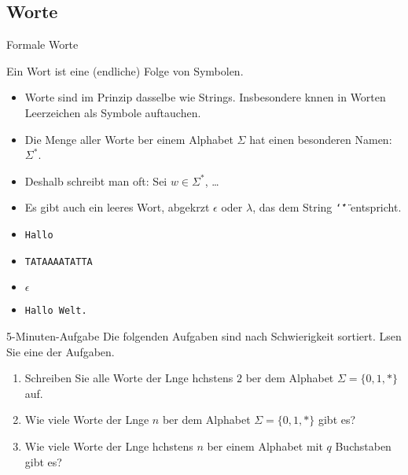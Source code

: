 \subsection{Worte}


\begin{frame}{Formale Worte}
  \begin{definition}[Wort]
    Ein \alert{Wort} ist eine (endliche) Folge von Symbolen. 
  \end{definition}
  \begin{itemize}
    \item Worte sind im Prinzip dasselbe wie
      Strings. Insbesondere knnen in Worten Leerzeichen als Symbole
      auftauchen.
    \item Die Menge aller Worte ber einem Alphabet $\Sigma$ hat einen
      besonderen Namen: $\Sigma^*$.
    \item 
      Deshalb schreibt man oft: Sei $w \in \Sigma^*$, \dots
    \item Es gibt auch ein \alert{leeres Wort}, abgekrzt
      $\epsilon$ oder $\lambda$, das dem String
      \texttt{\char`\"\char`\"} entspricht. 
    \end{itemize}
   
  \begin{examples}
    \begin{itemize}
    \item \texttt{Hallo}
    \item \texttt{TATAAAATATTA}
    \item $\epsilon$
    \item \texttt{Hallo Welt.}
    \end{itemize}
  \end{examples} 
\end{frame}


\begin{frame}{5-Minuten-Aufgabe}
  Die folgenden Aufgaben sind nach Schwierigkeit sortiert. Lsen Sie
  \alert{eine} der Aufgaben. 
  \begin{enumerate}
  \item
    Schreiben Sie alle Worte der Lnge hchstens $2$ ber dem Alphabet
    $\Sigma = \{0,1,*\}$ auf.
  \item
    Wie viele Worte der Lnge $n$ ber dem Alphabet $\Sigma =
    \{0,1,*\}$  gibt es?
  \item
    Wie viele Worte der Lnge hchstens $n$ ber einem Alphabet mit
    $q$ Buchstaben gibt es?
  \end{enumerate}
\end{frame}


